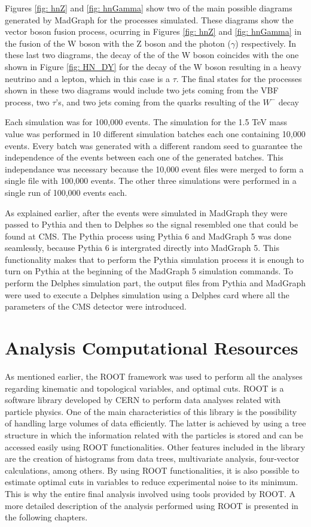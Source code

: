 Figures \ref{fig: hnZ} and \ref{fig: hnGamma} show two of the main possible diagrams generated by MadGraph for the processes simulated. These diagrams show the vector boson fusion process, ocurring in Figures \ref{fig: hnZ} and \ref{fig: hnGamma} in the fusion of the W boson with the Z boson and the photon ($\gamma$) respectively. In these last two diagrams, the decay of the of the W boson coincides with the one shown in Figure \ref{fig: HN_DY} for the decay of the W boson resulting in a heavy neutrino and a lepton, which in this case is a $\tau$. The final states for the processes shown in these two diagrams would include two jets coming from the VBF process, two $\tau$'s, and two jets coming from the quarks resulting of the $W^{-}$ decay

Each simulation was for 100,000 events. The simulation for the 1.5 TeV mass value was performed in 10 different simulation batches each one containing 10,000 events. Every batch was generated with a different random seed to guarantee the independence of the events between each one of the generated batches. This independance was necessary because the 10,000 event files were merged to form a single file with 100,000 events. The other three simulations were performed in a single run of 100,000 events each.

As explained earlier, after the events were simulated in MadGraph they were passed to Pythia and then to Delphes so the signal resembled one that could be found at CMS. The Pythia process using Pythia 6 and MadGraph 5 was done seamlessly, because Pythia 6 is intergrated directly into MadGraph 5. This functionality makes that to perform the Pythia simulation process it is enough to turn on Pythia at the beginning of the MadGraph 5 simulation commands. To perform the Delphes simulation part, the output files from Pythia and MadGraph were used to execute a Delphes simulation using a Delphes card where all the parameters of the CMS detector were introduced.

\section{Analysis Computational Resources}

As mentioned earlier, the ROOT framework was used to perform all the analyses regarding kinematic and topological variables, and optimal cuts. ROOT is a software library developed by CERN to perform data analyses related with particle physics. One of the main characteristics of this library is the possibility of handling large volumes of data efficiently. The latter is achieved by using a tree structure in which the information related with the particles is stored and can be accessed easily using ROOT functionalities. Other features included in the library are the creation of histograms from data trees, multivariate analysis, four-vector calculations, among others. By using ROOT functionalities, it is also possible to estimate optimal cuts in variables to reduce experimental noise to its minimum. This is why the entire final analysis involved using tools provided by ROOT. A more detailed description of the analysis performed using ROOT is presented in the following chapters.

